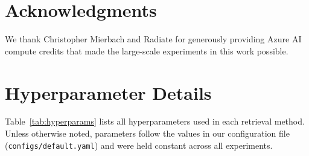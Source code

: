 \documentclass[11pt]{article}
\begin{document}
\section*{Acknowledgments}
We thank Christopher Mierbach and Radiate for generously providing Azure AI compute credits that made the large-scale experiments in this work possible.



\appendix

\section{Hyperparameter Details}
\label{app:hyperparams}

Table~\ref{tab:hyperparams} lists all hyperparameters used in each retrieval method. Unless otherwise noted, parameters follow the values in our configuration file (\texttt{configs/default.yaml}) and were held constant across all experiments.
\end{document}
